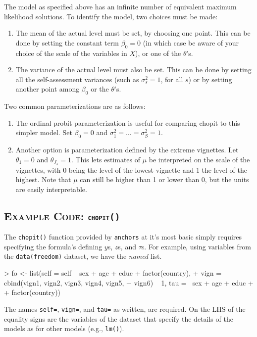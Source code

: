\documentclass{amsart}
\newcommand{\code}[1]{{\texttt{#1}}}
\newcommand{\pkg}[1]{{\texttt{#1}}}
\newcommand{\ssubsection}[2]{%
  \subsection[#1]{\normalfont\scshape #1: {\tt #2}}}
\begin{document}
The model as specified above has an infinite number of equivalent
maximum likelihood solutions.  To identify the model, two choices must
be made:
\begin{enumerate}
\item The mean of the actual level must be set, by choosing one point.
  This can be done by setting the constant term $\beta_0=0$ (in which
  case be aware of your choice of the scale of the variables in $X$),
  or one of the $\theta$'s.
\item The variance of the actual level must also be set.  This can be
  done by setting all the self-assessment variances (such as
  $\sigma^2_s=1$, for all $s$) or by setting another point among
  $\beta_0$ or the $\theta$'s.
\end{enumerate}
Two common parameterizations are as follows:
\begin{enumerate}
\item The ordinal probit parameterization is useful for comparing
  chopit to this simpler model.  Set $\beta_0=0$ and
  $\sigma^2_1=\dots=\sigma^2_S=1$.
\item Another option is parameterization defined by the extreme
  vignettes.  Let $\theta_1=0$ and $\theta_{J_s}=1$.  This lets
  estimates of $\mu$ be interpreted on the scale of the vignettes,
  with 0 being the level of the lowest vignette and 1 the level of the
  highest.  Note that $\mu$ can still be higher than 1 or lower than 0,
  but the units are easily interpretable.
\end{enumerate}

\ssubsection{Example Code}{chopit()}

The \code{chopit()} function provided by \pkg{anchors} at it's most
basic simply requires specifying the formula's defining $y$s, $z$s,
and $\tau$s.  For example, using variables from the
\code{data(freedom)} dataset, we have the {\em named} list.
\begin{Schunk}
\begin{Sinput}
> fo <- list(self = self ~ sex + age + educ + factor(country), 
+     vign = cbind(vign1, vign2, vign3, vign4, vign5, 
+         vign6) ~ 1, tau = ~sex + age + educ + 
+         factor(country))
\end{Sinput}
\end{Schunk}
The names \code{self=}, \code{vign=}, and \code{tau=} as written, are
required.  On the LHS of the equality signs are the variables of the
dataset that specify the details of the models as for other models
(e.g., \code{lm()}).
\end{document}
